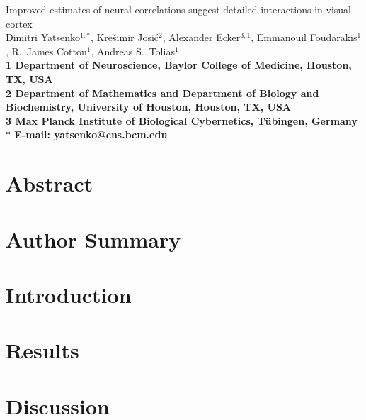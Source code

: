 \documentclass[10pt]{article}
\date{}
\begin{document}
\begin{flushleft}
{\Large
Improved estimates of neural correlations suggest detailed interactions in visual cortex
}
\\
Dimitri Yatsenko$^{1,\ast}$, 
Kre\v{s}imir Josi\'{c}$^{2}$,
Alexander Ecker$^{3,1}$,
Emmanouil Foudarakis$^{1}$,
R.~James Cotton$^{1}$,
Andreas S.~Tolias$^{1}$
\\
\bf{1} Department of Neuroscience, Baylor College of Medicine, Houston, TX, USA
\\
\bf{2} Department of Mathematics and Department of Biology and Biochemistry, University of Houston, Houston, TX, USA
\\
\bf{3} Max Planck Institute of Biological Cybernetics, T\"ubingen, Germany
\\
$\ast$ E-mail: yatsenko@cns.bcm.edu
\end{flushleft}

\section*{Abstract}


\section*{Author Summary}


\section*{Introduction}


\section*{Results}








\section*{Discussion}

\end{document}
